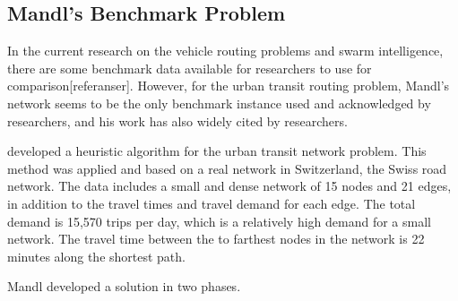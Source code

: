 \subsection{Mandl's Benchmark Problem}

In the current research on the vehicle routing problems and swarm intelligence, there are some benchmark data available for researchers to use for comparison[referanser]. However, for the urban transit routing problem, Mandl's network seems to be the only benchmark instance used and acknowledged by researchers, and his work has also widely cited by researchers.  
 
\citet{mandl79} developed a heuristic algorithm for the urban transit network problem. This method was applied and based on a real network in Switzerland, the Swiss road network. The data includes a small and dense network of 15 nodes and 21 edges, in addition to the travel times and travel demand for each edge. The total demand is 15,570 trips per day, which is a relatively high demand for a small network. The travel time between the to farthest nodes in the network is 22 minutes along the shortest path. 

Mandl developed a solution in two phases. 

